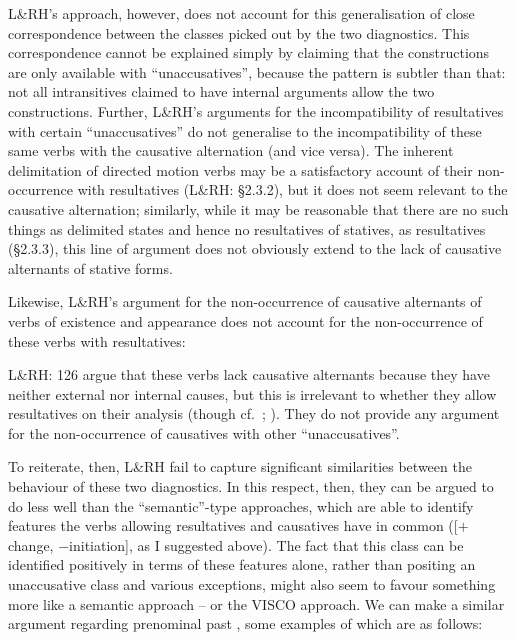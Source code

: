 \documentclass[output=paper]{langsci/langscibook}
\begin{document}
\ea
    \z
\z
L\&RH’s approach, however, does not account for this generalisation of close
correspondence between the classes picked out by the two diagnostics. This
correspondence cannot be explained simply by claiming that the constructions
are only available with \enquote{unaccusatives}, because the pattern is subtler
than that: not all intransitives claimed to have internal arguments allow the
two constructions. Further, L\&RH’s arguments for the incompatibility of
resultatives with certain \enquote{unaccusatives} do not generalise to the
incompatibility of these same verbs with the causative alternation (and vice
versa). The inherent delimitation of directed motion verbs may be a
satisfactory account of their non-occurrence with resultatives (L\&RH: §2.3.2),
but it does not seem relevant to the causative alternation; similarly, while it
may be reasonable that there are no such things as delimited states and hence
no resultatives of statives, as resultatives (§2.3.3), this line of argument
does not obviously extend to the lack of causative alternants of stative forms.

Likewise, L\&RH’s argument for the non-occurrence of causative alternants of
verbs of existence and appearance does not account for the non-occurrence of
these verbs with resultatives:

\ea
    \z
\z
L\&RH: 126 argue that these verbs lack causative alternants because they have
neither external nor internal causes, but this is irrelevant to whether they
allow resultatives on their analysis (though cf.\ \citealt{Ramchand2008};
\citealt{Baker2018,Baker2019}). They do not provide any argument for the
non-occurrence of causatives with other \enquote{unaccusatives}.

To reiterate, then, L\&RH fail to capture significant similarities between the
behaviour of these two diagnostics. In this respect, then, they can be argued
to do less well than the \enquote{semantic}-type approaches, which are able to
identify features the verbs allowing resultatives and causatives have in common
([$+$change, $-$initiation], as I suggested above). The fact that this class
can be identified positively in terms of these features alone, rather than
positing an unaccusative class and various exceptions, might also seem to
favour something more like a semantic approach – or the VISCO approach. We can
make a similar argument regarding prenominal past , some examples of
which are as follows:
\end{document}
